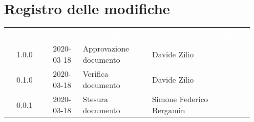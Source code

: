 \section*{Registro delle modifiche}
{
	\centering
	\begin{longtable}{ c c  C{4cm} C{4cm} C{3cm} }
		\textcolor{white}{\textbf{Versione}} & \textcolor{white}{\textbf{Data}} & \textcolor{white}{\textbf{Descrizione}} & \textcolor{white}{\textbf{Nominativo}} & \textcolor{white}{\textbf{Ruolo}}\\		
		1.0.0 & 2020-03-18 & Approvazione documento & Davide Zilio &\RdP{}\\		
		0.1.0 & 2020-03-18 & Verifica documento & Davide Zilio &\ver{}\\		
		0.0.1 & 2020-03-18 & Stesura documento & Simone Federico Bergamin &\reda{}\\		
		
	\end{longtable}

}